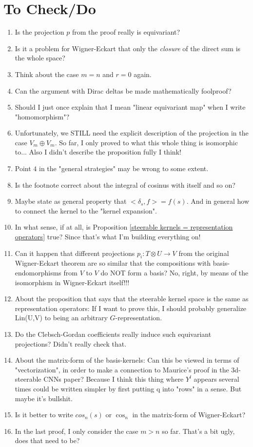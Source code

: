 \documentclass[12pt, a4paper]{article}
\theoremstyle{plain}
\theoremstyle{definition}
\theoremstyle{remark}
\begin{document}
\section{To Check/Do}

\begin{enumerate}
\item Is the projection $p$ from the proof really is equivariant?
\item Is it a problem for Wigner-Eckart that only the \emph{closure} of the direct sum is the whole space?
\item Think about the case $m = n$ and $r = 0$ again.
\item Can the argument with Dirac deltas be made mathematically foolproof?
\item Should I just once explain that I mean "linear equivariant map" when I write "homomorphism"?
\item Unfortunately, we STILL need the explicit description of the projection in the case $V_m \oplus V_m$. So far, I only proved to what this whole thing is isomorphic to... Also I didn't describe the proposition fully I think!
\item Point $4$ in the "general strategies" may be wrong to some extent.
\item Is the footnote correct about the integral of cosinus with itself and so on?
\item Maybe state as general property that $<\delta_s, f> = f(s)$. And in general how to connect the kernel to the "kernel expansion".
\item In what sense, if at all, is Proposition \ref{steerable kernels = representation operators} true? Since that's what I'm building everything on!
\item Can it happen that different projections $p_i: T \otimes U \to V$ from the original Wigner-Eckart theorem are so similar that the compositions with basis-endomorphisms from $V$ to $V$ do NOT form a basis? No, right, by means of the isomorphism in Wigner-Eckart itself!!!
\item About the proposition that says that the steerable kernel space is the same as representation operators: If I want to prove this, I should probably generalize Lin(U,V) to being an arbitrary $G$-representation.
\item Do the Clebsch-Gordan coefficients really induce such equivariant projections? Didn't really check that.
\item About the matrix-form of the basis-kernels: Can this be viewed in terms of "vectorization", in order to make a connection to Maurice's proof in the 3d-steerable CNNs paper? Because I think this thing where $Y^l$ appears several times could be written simpler by first putting q into "rows" in a sense. But maybe it's bullshit.
\item Is it better to write $cos_n(s)$ or $\cos_n$ in the matrix-form of Wigner-Eckart?
\item In the last proof, I only consider the case $m > n$ so far. That's a bit ugly, does that need to be?
\end{enumerate}
\end{document}
